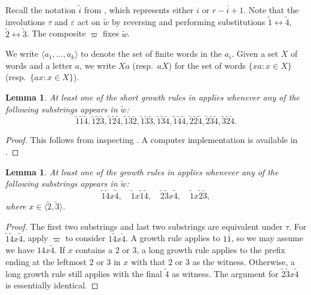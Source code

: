 \documentclass{amsart}
\newtheorem{lemma}[theorem]{Lemma}
\theoremstyle{definition}
\theoremstyle{remark}
\numberwithin{equation}{section}
\begin{document}
Recall the notation $\widetilde{i}$ from , which represents either $i$ or $\overline{r-i+1}$. Note that the involutions $\tau$ and $\varepsilon$ act on $\widetilde{w}$ by reversing and performing substitutions $\tilde{1} \leftrightarrow \tilde{4}$, $\tilde{2} \leftrightarrow \tilde{3}$. The composite $\varpi$ fixes $\widetilde{w}$. 

We write $\langle a_1,\ldots,a_k \rangle$ to denote the set of finite words in the $a_i$. Given a set $X$ of words and a letter $a$, we write $Xa$ (resp.\ $aX$) for the set of words $\{xa : x \in X\}$ (resp.\ $\{ax : x \in X\}$).

\begin{lemma}\label{lem:short_patterns}
  At least one of the short growth rules in  applies whenever any of the following substrings appears in $\widetilde{w}$:
    \[ \tilde{1}\tilde{1}\tilde{4}, \tilde{1}\tilde{2}\tilde{3}, \tilde{1}\tilde{2}\tilde{4}, \tilde{1}\tilde{3}\tilde{2}, \tilde{1}\tilde{3}\tilde{3}, \tilde{1}\tilde{3}\tilde{4}, \tilde{1}\tilde{4}\tilde{4}, \tilde{2}\tilde{2}\tilde{4}, \tilde{2}\tilde{3}\tilde{4}, \tilde{3}\tilde{2}\tilde{4}.  \]
\end{lemma}
\begin{proof}
    This follows from inspecting . A computer implementation is available in \cite[\S6]{sl4-web-basis-code}.
\end{proof}


\begin{lemma}\label{lem:long_patterns}
  At least one of the growth rules in  applies whenever any of the following substrings appears in $\widetilde{w}$:
    \[ \tilde{1}\tilde{4}x\tilde{4}, \quad \tilde{1}x\tilde{1}\tilde{4}, \quad \tilde{2}\tilde{3}x\tilde{4}, \quad \tilde{1}x\tilde{2}\tilde{3}, \]
  where $x\in \langle \tilde{2},\tilde{3}\rangle$. 
\end{lemma}

\begin{proof}
  The first two substrings and last two substrings are equivalent under $\tau$. For $\tilde{1}\tilde{4}x\tilde{4}$, apply $\varpi$ to consider $1\tilde{4}x\tilde{4}$. A growth rule applies to $1\overline{1}$, so we may assume we have $14x\tilde{4}$. If $x$ contains a $2$ or $3$, a long growth rule applies to the prefix ending at the leftmost $2$ or $3$ in $x$ with that $2$ or $3$ as the witness. Otherwise, a long growth rule still applies with the final $\tilde{4}$ as witness. The argument for $\tilde{2}\tilde{3}x\tilde{4}$ is essentially identical.
\end{proof}
\end{document}

